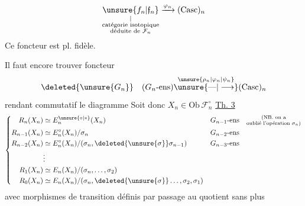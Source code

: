 \[ \underset{\substack{|\\\text{catégorie isotopique}\\\text{déduite de }\mathcal F_n}}{\unsure{f_n|\mathfrak f_n}}\xrightarrow{\varphi_n}(\mathrm{Casc})_n \]
Ce foncteur est pl. fidèle.

Il faut encore trouver   foncteur 
\[ \deleted{\unsure{G_n}}\quad(G_n\text{-ens})\overset{\unsure{\rho_n|\varphi_n|\psi_n}}{\unsure{\text{---}|\longrightarrow}}(\mathrm{Casc})_n \]
rendant commutatif le diagramme
Soit donc $X_n\in\mathrm{Ob}\,\mathcal F_n^\circ$
\uline{Th. 3}
\[ \left\{\begin{aligned} R_n(X_n)&\simeq E_n^{\unsure{\circ|\ast}}(X_n) && G_{n-1}\text{-ens}\quad\substack{\text{(NB. on a}\\\text{oublié l'opération }\sigma_n)}\\ R_{n-1}(X_n)&\simeq E_n^\circ(X_n)/\sigma_n && G_{n-2}\text{-ens}\\ R_{n-2}(X_n)&\simeq E_n^\circ(X_n)/(\sigma_n,\deleted{\unsure{\sigma}}\sigma_{n-1}) && G_{n-3}\text{-ens}\\ &\vdots\\ R_1(X_n)&\simeq E_n(X_n)/(\sigma_n,\ldots,\sigma_2)\\ R_0(X_n)&\simeq E_n(X_n)/(\sigma_n,\deleted{\unsure{\sigma}}\ldots,\sigma_2,\sigma_1) \end{aligned}\right. \]
\margin{$\checkmark$}
avec morphismes de transition définis par passage au quotient sans plus
